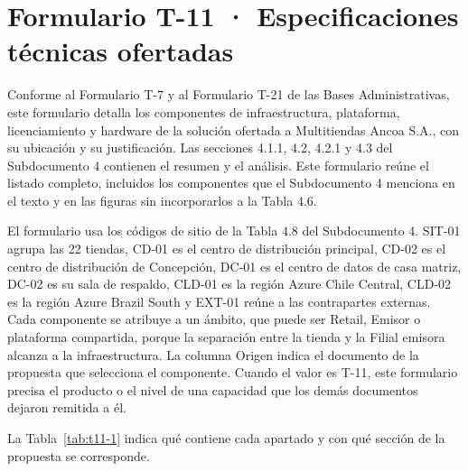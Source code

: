 \documentclass[11pt]{article}
\begin{document}
\tableofcontents
\clearpage

\renewcommand{\tablename}{Tabla}
\renewcommand{\thetable}{T-11.\arabic{table}}

\section{Formulario T-11 · Especificaciones técnicas ofertadas}\label{formulario-t-11}

Conforme al Formulario T-7 y al Formulario T-21 de las Bases Administrativas, este formulario detalla los componentes de infraestructura, plataforma, licenciamiento y hardware de la solución ofertada a Multitiendas Ancoa S.A., con su ubicación y su justificación. Las secciones 4.1.1, 4.2, 4.2.1 y 4.3 del Subdocumento 4 contienen el resumen y el análisis. Este formulario reúne el listado completo, incluidos los componentes que el Subdocumento 4 menciona en el texto y en las figuras sin incorporarlos a la Tabla 4.6.

El formulario usa los códigos de sitio de la Tabla 4.8 del Subdocumento 4. SIT-01 agrupa las 22 tiendas, CD-01 es el centro de distribución principal, CD-02 es el centro de distribución de Concepción, DC-01 es el centro de datos de casa matriz, DC-02 es su sala de respaldo, CLD-01 es la región Azure Chile Central, CLD-02 es la región Azure Brazil South y EXT-01 reúne a las contrapartes externas. Cada componente se atribuye a un ámbito, que puede ser Retail, Emisor o plataforma compartida, porque la separación entre la tienda y la Filial emisora alcanza a la infraestructura. La columna Origen indica el documento de la propuesta que selecciona el componente. Cuando el valor es T-11, este formulario precisa el producto o el nivel de una capacidad que los demás documentos dejaron remitida a él.

La Tabla~\mbox{\ref{tab:t11-1}} indica qué contiene cada apartado y con qué sección de la propuesta se corresponde.
\end{document}
